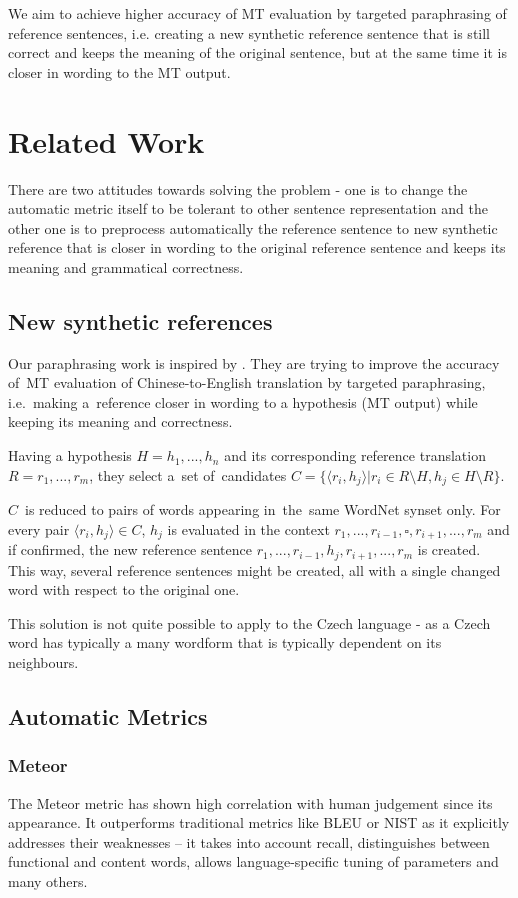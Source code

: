 \documentclass[11pt]{article}
\begin{document}
We aim to achieve higher accuracy of MT evaluation by targeted paraphrasing 
of reference sentences, i.e. creating a new synthetic reference sentence that 
is still correct and keeps the meaning of the original sentence, but at the 
same time it is closer in wording to the MT output. 


\section{Related Work}
There are two attitudes towards solving the problem - one is to change the automatic metric itself to be tolerant to other sentence representation and the other one is to preprocess automatically the reference sentence to new synthetic reference that is closer in wording to the original reference sentence and keeps its meaning and grammatical correctness.
\subsection{New synthetic references}
Our paraphrasing work is inspired by . They are trying to improve the 
accuracy of~MT evaluation of Chinese-to-English translation by targeted paraphrasing, i.e.~making 
a~reference closer in wording to a hypothesis (MT output) while keeping its meaning and correctness.

Having a hypothesis $ H = h_1,...,h_n $ and its corresponding reference translation $ R =r_1, ...,r_m $,
they select a~set of~candidates $ C = \lbrace \langle r_i,h_j \rangle  \vert r_i \in R \setminus H
 , h_j \in H \setminus R \rbrace $. 
 
$ C $~is reduced to pairs of words appearing in~the~same WordNet \cite{wordnet} synset only. For every pair 
$  \langle r_i,h_j \rangle \in C $, $ h_j $ is evaluated in the context $ r_1,...,r_{i-1},\square,r_{i+1},...,r_m $
and if confirmed, the new reference sentence $ r_1,...,r_{i-1},h_j,r_{i+1},...,r_m $ is created.
This way, several reference sentences might be created, all with a single changed word with respect
to the original one.

This solution is not quite possible to apply to the Czech language - as a Czech word has typically a 
many wordform that is typically dependent on its neighbours.


\subsection{Automatic Metrics}
\subsubsection{Meteor}
The Meteor metric \cite{meteor-wmt:2011} has shown high correlation with human 
judgement since its appearance. It outperforms traditional metrics like BLEU \cite{bleu} 
or NIST \cite{nist} as it explicitly addresses their weaknesses -- it takes into account 
recall, distinguishes between functional and content words, allows language-specific 
tuning of parameters and many others.
\end{document}
